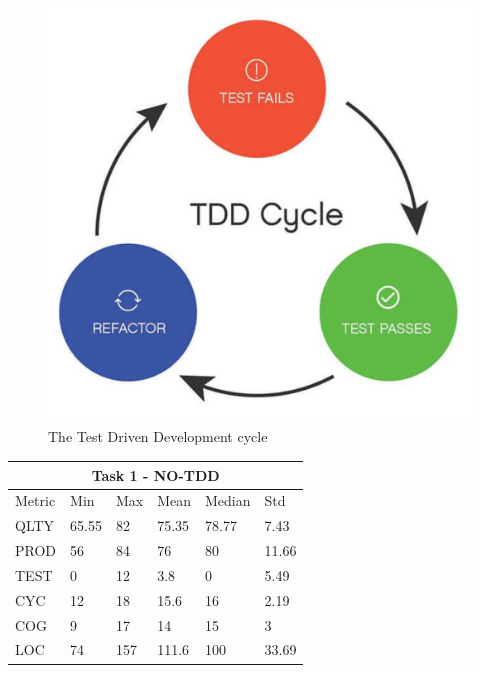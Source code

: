\begin{figure}[h]
    \centering
    \includegraphics[width=\linewidth]{figures/tdd_cycle.jpg}
    \caption{The Test Driven Development cycle}
    \label{fig}
\end{figure}

\noindent
\begin{tabular}{ |p{2cm}||p{1.6cm}|p{1.6cm}|p{1.6cm}|p{1.6cm}|p{1.6cm}|}
    \hline
        \multicolumn{6}{|c|}{Task 1 - NO-TDD} \\
    \hline
        Metric & Min & Max & Mean & Median & Std\\
    \hline
        QLTY & 65.55 & 82 & 75.35 & 78.77 & 7.43 \\
        PROD & 56 & 84 & 76 & 80 & 11.66 \\
        TEST & 0 & 12 & 3.8 & 0 & 5.49 \\
        CYC & 12 & 18 & 15.6 & 16 & 2.19 \\
        COG & 9 & 17 & 14 & 15 & 3 \\
        LOC & 74 & 157 & 111.6 & 100 & 33.69 \\
    \hline
\end{tabular}
\\ \  \\


